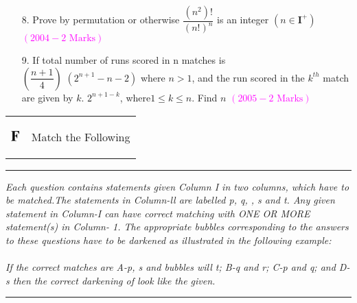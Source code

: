 \documentclass[journal,12pt,twocolumn]{IEEEtran}
\theoremstyle{remark}
\begin{document}
\begin{enumerate}
    (a) \hspace{0.2cm} The women are in majority?
    
    (b) \hspace{0.2cm} The men are in majority?
    
    \item[8. \hspace{0.5cm}] Prove by permutation or otherwise $\dfrac{(n^2)!}{(n!)^n}$ is an integer $(n\in \mathbf{I}^+) $\hfill \textcolor{magenta}{$(2004-2\text{ Marks})$}  
     \item[9. \hspace{0.5cm}] If total number of runs scored in n matches is\\
     
     $\left(\dfrac{n+1}{4}\right)$ $(2^{n+1}-n-2)$ where $n>1$, and the run scored in the $k^{th}$ match are given by $k$. $2^{n+1-k}$, where$ 1 \leq k \leq n$. Find $n$ \hfill \textcolor{magenta}{$(2005- 2 \text{ Marks})$}
     
    \end{enumerate}
\newpage
\onecolumn
\begin{tabular}{p{1.5cm}p{10cm}}
   $\Large \textbf{F} $  &   \begin{Large}
   Match the Following 
   \end{Large}   
\end{tabular}
\noindent
\rule{1\textwidth}{1pt} %

\noindent
\begin{minipage}[t]{0.69\textwidth} 
    \textit{Each question contains statements given Column I in two columns, which have to be matched.The statements in Column-ll are labelled p, q, , s and t. Any given statement in Column-I can have correct matching with ONE OR MORE statement(s) in Column- 1. The appropriate bubbles corresponding to the answers to these questions have to be darkened as illustrated in the following example: }\\ \\
    \textit{If the correct matches are A-p, s and
bubbles will
t; B-q and r; C-p and q; and D-s then the correct darkening of look like the given.} 

    
\end{minipage}
\hfill
\begin{minipage}[t]{0.3\textwidth} 
    
\end{minipage}
\noindent
\rule{1\textwidth}{1pt} %
\end{document}
